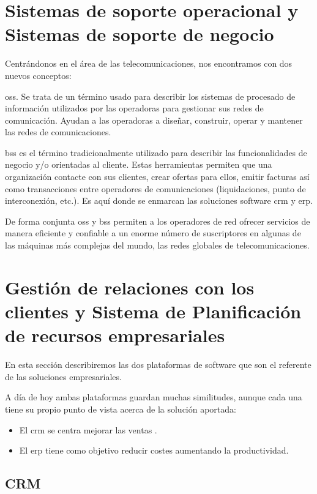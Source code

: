 \section{Sistemas de soporte operacional y Sistemas de soporte de negocio}

Centrándonos en el área de las telecomunicaciones, nos encontramos con dos nuevos conceptos:


\acrfull{oss}. Se trata de un término usado para describir los sistemas de procesado de información utilizados por las operadoras para gestionar sus redes de comunicación. Ayudan a las operadoras a diseñar, construir, operar y mantener las redes de comunicaciones.

\acrfull{bss} es el término tradicionalmente utilizado para describir las funcionalidades de negocio y/o orientadas al cliente. Estas herramientas  permiten que una organización contacte con sus clientes, crear ofertas para ellos, emitir facturas así como transacciones entre operadores de comunicaciones (liquidaciones, punto de interconexión, etc.). Es aquí donde se enmarcan las soluciones software \acrshort{crm} y \acrshort{erp}.

De forma conjunta \acrshort{oss} y \acrshort{bss} permiten a los operadores de red ofrecer servicios de manera eficiente y confiable a un enorme número de suscriptores en algunas de las máquinas más complejas del mundo, las redes globales de telecomunicaciones.




\section{Gestión de relaciones con los clientes y Sistema de Planificación de recursos empresariales}

En esta sección describiremos las dos plataformas de software que son el referente de las soluciones empresariales.

A día de hoy ambas plataformas guardan muchas similitudes, aunque cada una tiene su propio punto de vista acerca de la solución aportada:
\begin{itemize}
\item El \acrshort{crm} se centra mejorar las ventas .
\item El \acrshort{erp} tiene como objetivo reducir costes aumentando la productividad.
\end{itemize}



\subsection{CRM}
\label{sub:crm}

